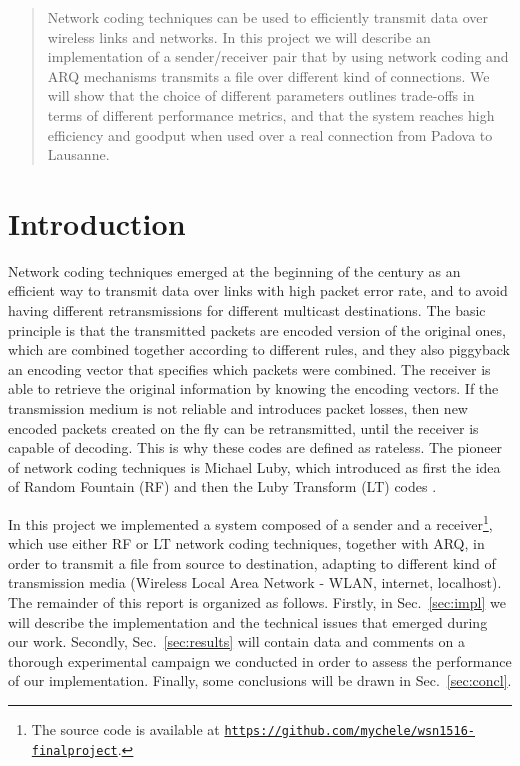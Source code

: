 \begin{abstract}
Network coding techniques can be used to efficiently transmit data over wireless links and networks. In this project we will describe an implementation of a sender/receiver pair that by using network coding and ARQ mechanisms transmits a file over different kind of connections. We will show that the choice of different parameters outlines trade-offs in terms of different performance metrics, and that the system reaches high efficiency and goodput when used over a real connection from Padova to Lausanne.
\end{abstract}

\section{Introduction}
Network coding techniques emerged at the beginning of the century as an efficient way to transmit data over links with high packet error rate, and to avoid having different retransmissions for different multicast destinations. The basic principle is that the transmitted packets are encoded version of the original ones, which are combined together according to different rules, and they also piggyback an encoding vector that specifies which packets were combined. The receiver is able to retrieve the original information by knowing the encoding vectors. If the transmission medium is not reliable and introduces packet losses, then new encoded packets created on the fly can be retransmitted, until the receiver is capable of decoding. This is why these codes are defined as rateless. The pioneer of network coding techniques is Michael Luby, which introduced as first the idea of Random Fountain (RF) \cite{rf} and then the Luby Transform (LT) codes \cite{lt}.

In this project we implemented a system composed of a sender and a receiver\footnote{The source code is available at \texttt{\url{https://github.com/mychele/wsn1516-finalproject}}.}, which use either RF or LT network coding techniques, together with ARQ, in order to transmit a file from source to destination, adapting to different kind of transmission media (Wireless Local Area Network - WLAN, internet, localhost). The remainder of this report is organized as follows. Firstly, in Sec.~\ref{sec:impl} we will describe the implementation and the technical issues that emerged during our work. Secondly, Sec.~\ref{sec:results} will contain data and comments on a thorough experimental campaign we conducted in order to assess the performance of our implementation. Finally, some conclusions will be drawn in Sec.~\ref{sec:concl}.